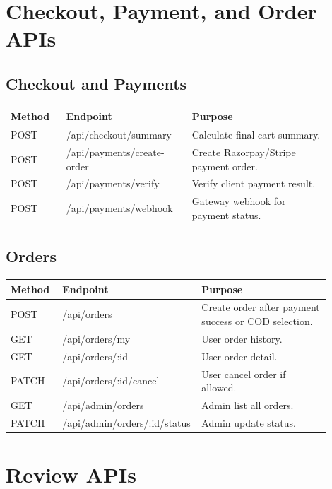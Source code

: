 \documentclass[11pt,a4paper]{article}
\begin{document}
\section{Checkout, Payment, and Order APIs}

\subsection{Checkout and Payments}

\begin{longtable}{p{0.16\linewidth} p{0.34\linewidth} p{0.40\linewidth}}
\toprule
\textbf{Method} & \textbf{Endpoint} & \textbf{Purpose} \\
\midrule
POST & /api/checkout/summary & Calculate final cart summary. \\
POST & /api/payments/create-order & Create Razorpay/Stripe payment order. \\
POST & /api/payments/verify & Verify client payment result. \\
POST & /api/payments/webhook & Gateway webhook for payment status. \\
\bottomrule
\end{longtable}

\subsection{Orders}

\begin{longtable}{p{0.16\linewidth} p{0.34\linewidth} p{0.40\linewidth}}
\toprule
\textbf{Method} & \textbf{Endpoint} & \textbf{Purpose} \\
\midrule
POST & /api/orders & Create order after payment success or COD selection. \\
GET & /api/orders/my & User order history. \\
GET & /api/orders/:id & User order detail. \\
PATCH & /api/orders/:id/cancel & User cancel order if allowed. \\
GET & /api/admin/orders & Admin list all orders. \\
PATCH & /api/admin/orders/:id/status & Admin update status. \\
\bottomrule
\end{longtable}

\section{Review APIs}
\end{document}
